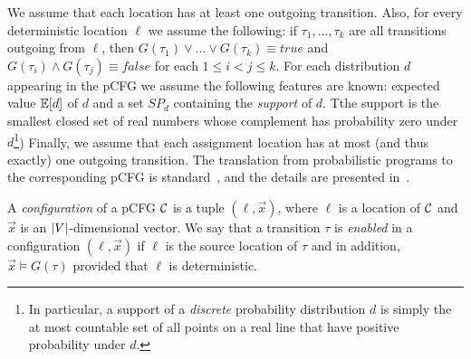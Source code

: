 \begin{definition}
We assume that each location has at least one outgoing transition.
Also, for every deterministic location $\ell$ we assume the following: if
$\tau_1,\dots,\tau_k$ are all transitions outgoing from $\ell$, then $G(\tau_1)
\vee \dots \vee G(\tau_k) \equiv \mathit{true}$ and $G(\tau_i) \wedge G(\tau_j)
\equiv \mathit{false}$ for each $1\leq i < j \leq k$. For each 
distribution $d$ appearing in the 
pCFG we assume the following features are known: expected value $\mathbb{E}[d]$ of 
$d$ and a set $SP_d$ containing the \emph{support} of $d$. Tthe support is the  
smallest 
closed set of real numbers whose complement has probability zero 
under $d$\footnote{In particular, a support of a \emph{discrete} probability 
	distribution $d$ is simply the at most countable set of all points on a 
	real 
	line that have positive probability under $d$.}) Finally, we assume that 
	each 
assignment location has at most (and thus exactly) one outgoing transition. The 
translation from probabilistic programs to the corresponding pCFG is 
standard~\cite{CFNH16:prob-termination}, and the details are presented 
in~\AppendixMaterial.
\end{definition}



\smallskip{}
A \emph{configuration} of a pCFG $\mathcal{C}$ is a tuple $(\ell,\vec{x})$,
where $\ell$ is a location of $\mathcal{C}$ and $\vec{x}$ is an 
$|V|$-dimensional vector.
We say that a transition $\tau$ is \emph{enabled} in a configuration
$(\ell,\vec{x})$ if $\ell$ is the source location of $\tau$ and in addition,
${\vec{x}}\models G(\tau)$ provided that $\ell$ is deterministic. 

